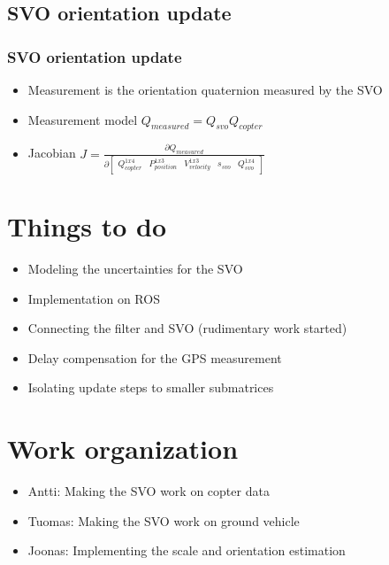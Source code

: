 \documentclass{beamer}
\begin{document}
\subsection{SVO orientation update}
\begin{frame}
\frametitle{SVO orientation update}
  \begin{itemize}
  \item Measurement is the orientation quaternion measured by the SVO
  \item Measurement model $Q_{measured} = Q_{svo}Q_{copter}$
  \item Jacobian $J = \frac{\partial Q_{measured}}{\partial \begin{bmatrix}Q_{copter}^{1x4} & P_{position}^{1x3} & V_{velocity}^{1x3}& s_{svo} & Q_{svo}^{1x4}\end{bmatrix}}$
  \end{itemize} 
\end{frame}

\section{Things to do}
\begin{frame}
\begin{itemize}
  \item Modeling the uncertainties for the SVO
  \item Implementation on ROS
  \item Connecting the filter and SVO (rudimentary work started)
  \item Delay compensation for the GPS measurement
  \item Isolating update steps to smaller submatrices
\end{itemize}

\end{frame}

\section{Work organization}
\begin{frame}
\begin{itemize}
  \item Antti: Making the SVO work on copter data
  \item Tuomas: Making the SVO work on ground vehicle
  \item Joonas: Implementing the scale and orientation estimation
\end{itemize}
\end{frame}


\end{document}
